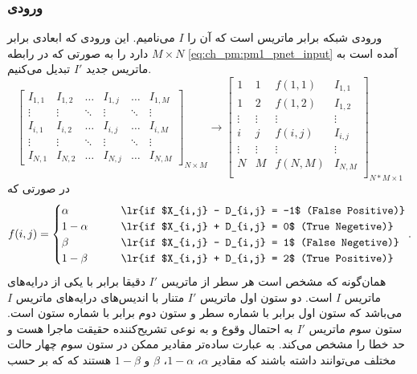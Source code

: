 \subsubsection{ورودی}
ورودی شبکه برابر ماتریس  است که آن را $I$ می‌نامیم. این ورودی که ابعادی برابر $M\times N$ دارد را به صورتی که در رابطه \ref{eq:ch_pm:pm1_pnet_input} آمده است به ماتریس جدید $I'$ تبدیل می‌کنیم. 
\begin{equation*}
	\begin{bmatrix}
		I_{1,1}  & I_{1,2} & \ldots   & I_{1,j}   & \ldots & I_{1,M}\\
		\vdots & \vdots & \ddots & \vdots & \ddots & \vdots \\
		I_{i,1}  & I_{i,2} & \ldots   & I_{i,j}   & \ldots & I_{i,M}\\
		\vdots & \vdots & \ddots & \vdots & \ddots & \vdots \\
		I_{N,1}  & I_{N,2} & \ldots   & I_{N,j}   & \ldots & I_{N,M}
	\end{bmatrix}_{N\times M}
	\rightarrow 
	 \begin{bmatrix}
	 	1          & 1         & f(1,1) & I_{1,1} \\
	 	1          & 2         & f(1,2) & I_{1,2} \\
	 	\vdots & \vdots & \vdots   & \vdots \\
	 	i          & j           & f(i,j)  & I_{i,j} \\
	 	\vdots & \vdots & \vdots   & \vdots \\
	 	N          & M         & f(N,M) & I_{N,M}\\
	 \end{bmatrix}_{N*M\times 1}
 	\label{eq:ch_pm:pm1_pnet_input}
\end{equation*}
در صورتی که
\begin{equation}
	f(i,j) = 
	\begin{cases}
		\alpha 	   \qquad & \text{\lr{if $X_{i,j} - D_{i,j} = -1$ (False Positive)}} \\
		1-\alpha  \qquad & \text{\lr{if $X_{i,j} + D_{i,j} = 0$ (True Negetive)}} \\
		\beta 		\qquad & \text{\lr{if $X_{i,j} - D_{i,j} =  1$ (False Negetive)}} \\
		1-\beta    \qquad & \text{\lr{if $X_{i,j} + D_{i,j} = 2$ (True Positive)}} 
	\end{cases}.
\end{equation}
همان‌گونه که مشخص است هر سطر از ماتریس $I'$ دقیقا برابر با یکی از درایه‌های ماتریس $I$ است. دو ستون اول ماتریس $I'$ متنار با اندیس‌های درایه‌های ماتریس $I$ می‌باشد که ستون اول برابر با شماره سطر و ستون دوم برابر با شماره ستون است. ستون سوم ماتریس $I'$ به احتمال وقوع و به نوعی تشریح‌کننده حقیقت ماجرا هست و حد خطا را مشخص می‌کند. به عبارت ساده‌تر مقادیر ممکن در ستون سوم چهار حالت مختلف می‌توانند داشته باشند که مقادیر $\alpha$، $1-\alpha$، $\beta$ و $1-\beta$ هستند که که بر حسب
